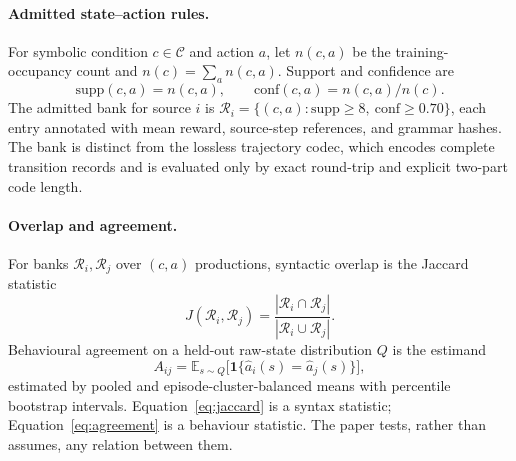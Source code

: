 \documentclass[11pt,a4paper]{article}
\theoremstyle{definition}
\begin{document}
\paragraph{Admitted state--action rules.}
For symbolic condition $c \in \mathcal{C}$ and action $a$, let
$n(c,a)$ be the training-occupancy count and
$n(c) = \sum_{a} n(c,a)$. Support and confidence are
\begin{equation}
\mathrm{supp}(c,a) = n(c,a),
\qquad
\mathrm{conf}(c,a) = n(c,a) / n(c).
\label{eq:rules}
\end{equation}
The admitted bank for source $i$ is
$\mathcal{R}_i = \{(c,a) : \mathrm{supp} \ge 8,\ \mathrm{conf} \ge 0.70\}$,
each entry annotated with mean reward, source-step references, and grammar
hashes. The bank is distinct from the lossless trajectory codec, which encodes
complete transition records and is evaluated only by exact round-trip and
explicit two-part code length.

\paragraph{Overlap and agreement.}
For banks $\mathcal{R}_i,\mathcal{R}_j$ over $(c,a)$ productions, syntactic
overlap is the Jaccard statistic
\begin{equation}
J(\mathcal{R}_i,\mathcal{R}_j)
= \frac{|\mathcal{R}_i \cap \mathcal{R}_j|}
{|\mathcal{R}_i \cup \mathcal{R}_j|}.
\label{eq:jaccard}
\end{equation}
Behavioural agreement on a held-out raw-state distribution $Q$ is the
estimand
\begin{equation}
A_{ij} = \mathbb{E}_{s \sim Q}\big[\mathbf{1}\{\hat{a}_i(s)=\hat{a}_j(s)\}\big],
\label{eq:agreement}
\end{equation}
estimated by pooled and episode-cluster-balanced means with percentile
bootstrap intervals. Equation~\eqref{eq:jaccard} is a syntax statistic;
Equation~\eqref{eq:agreement} is a behaviour statistic. The paper tests,
rather than assumes, any relation between them.
\end{document}
